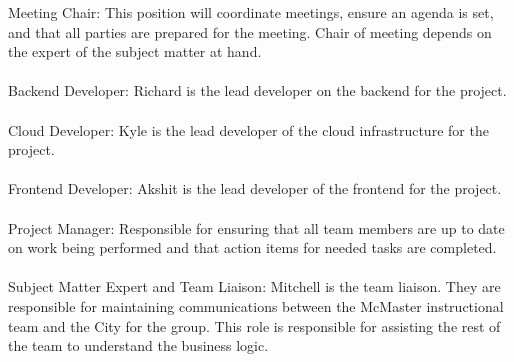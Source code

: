 \documentclass{article}
\begin{document}
Meeting Chair: This position will coordinate meetings, ensure an agenda is set, and that all parties are
prepared for the meeting. Chair of meeting depends on the expert of the subject matter at hand.\\
\\
Backend Developer: Richard is the lead developer on the backend for the project.\\
\\
Cloud Developer: Kyle is the lead developer of the cloud infrastructure for the project.\\
\\
Frontend Developer: Akshit is the lead developer of the frontend for the project.\\
\\
Project Manager: Responsible for ensuring that all team members are up to date on work being performed
and that action items for needed tasks are completed.\\
\\
Subject Matter Expert and Team Liaison: Mitchell is the team liaison. They are responsible for maintaining communications between the
McMaster instructional team and the City for the group. This role is responsible for assisting the rest of the team to understand
the business logic. \\
\end{document}
